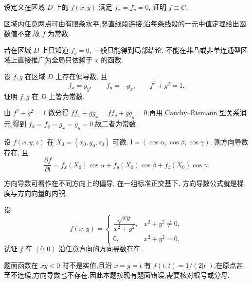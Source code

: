 \begin{example}
    设定义在区域 $D$ 上的 $f(x,y)$ 满足 $f_x=f_y=0$, 证明 $f\equiv C$.
\end{example}
\exampleblank

\begin{solution}
    区域内任意两点可由有限条水平,竖直线段连接;沿每条线段的一元中值定理给出函数值不变,故 $f$ 为常数.
\end{solution}

\begin{remark}
    若在区域 $D$ 上只知道 $f_y=0$, 一般只能得到局部结论, 不能在非凸或非单连通型区域上直接推广为全局只依赖于 $x$ 的函数.
\end{remark}

\begin{example}
    设 $f,g$ 在区域 $D$ 上存在偏导数, 且
    \[
        f_x=g_y,\qquad f_y=-g_x,\qquad f^2+g^2=1.
    \]
    证明 $f,g$ 在 $D$ 上皆为常数.
\end{example}
\exampleblank

\begin{solution}
    由 $f^2+g^2=1$ 微分得 $ff_x+gg_x=ff_y+gg_y=0$,再用 Cauchy--Riemann 型关系消元,得到 $f_x=f_y=g_x=g_y=0$,故二者为常数.
\end{solution}

\begin{theorem}[\markstar]
    设 $f(x,y,z)$ 在 $X_0=(x_0,y_0,z_0)$ 可微, $\bm l=(\cos\alpha,\cos\beta,\cos\gamma)$, 则方向导数存在, 且
    \[
        \dfrac{\partial f}{\partial l}
        =f_x(X_0)\cos\alpha+f_y(X_0)\cos\beta+f_z(X_0)\cos\gamma.
    \]
\end{theorem}

\begin{remark}
    方向导数可看作在不同方向上的偏导. 在一组标准正交基下, 方向导数公式就是梯度与方向向量的内积.
\end{remark}

\begin{example}
    设
    \[
        f(x,y)=
        \begin{cases}
            \dfrac{\sqrt{xy}}{x^2+y^2}, & x^2+y^2\ne0, \\
            0,                          & x^2+y^2=0,
        \end{cases}
    \]
    试证 $f$ 在 $(0,0)$ 沿任意方向的方向导数存在.
\end{example}
\exampleblank

\begin{solution}
    题面函数在 $xy<0$ 时不是实值,且沿 $x=y=t$ 有 $f(t,t)=1/(2|t|)$,在原点甚至不连续,方向导数也不存在.因此本题按现有题面错误,需要核对根号或分母.
\end{solution}

